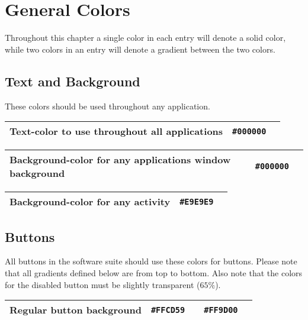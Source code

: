 
\chapter{General Colors}
Throughout this chapter a single color in each entry will denote a solid color, while two colors in an entry will denote a gradient between the two colors.

\section{Text and Background}
These colors should be used throughout any application.

\begin{table}[!htbp]
	\begin{tabularx}{\textwidth}{X r c}
		Text-color to use throughout all applications 
		& \texttt{\#000000} & \cellcolor[HTML]{000000}\phantom{--} \\ \hline
	\end{tabularx}
\end{table}

\begin{table}[!htbp]
	\begin{tabularx}{\textwidth}{X r c}
		Background-color for any applications window background 
		& \texttt{\#000000} & \cellcolor[HTML]{000000}\phantom{--} \\ \hline
	\end{tabularx}
\end{table}

\begin{table}[!htbp]
	\begin{tabularx}{\textwidth}{X r c}
		Background-color for any activity 
		& \texttt{\#E9E9E9} & \cellcolor[HTML]{E9E9E9}\phantom{--} \\ \hline
	\end{tabularx}
\end{table}

\section{Buttons}
All buttons in the \giraf software suite should use these colors for buttons. Please note that all gradients defined below are from top to bottom. Also note that the colors for the disabled button must be slightly transparent ($65\%$).

\begin{table}[!htbp]
	\begin{tabularx}{\textwidth}{X r c r c}
		Regular button background 
		& \texttt{\#FFCD59} & \cellcolor[HTML]{FFCD59}\phantom{--}
		& \texttt{\#FF9D00} & \cellcolor[HTML]{FF9D00}\phantom{--} \\ \hline
	\end{tabularx}
\end{table}

